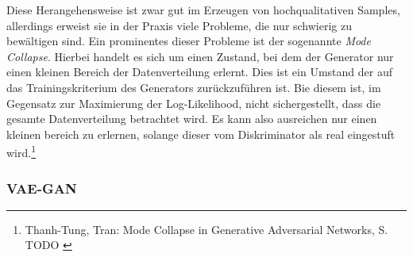 Diese Herangehensweise ist zwar gut im Erzeugen von hochqualitativen Samples, allerdings erweist sie in der Praxis viele Probleme, die nur schwierig zu bewältigen sind. Ein prominentes dieser Probleme ist der sogenannte \textit{Mode Collapse}. Hierbei handelt es sich um einen Zustand, bei dem der Generator nur einen kleinen Bereich der Datenverteilung erlernt. Dies ist ein Umstand der auf das Trainingskriterium des Generators zurückzuführen ist. Bie diesem ist, im Gegensatz zur Maximierung der Log-Likelihood, nicht sichergestellt, dass die gesamte Datenverteilung betrachtet wird. Es kann also ausreichen nur einen kleinen bereich zu erlernen, solange dieser vom Diskriminator als real eingestuft wird.\footnote{
    Thanh-Tung, Tran: Mode Collapse in Generative Adversarial Networks, S. TODO
    \cite{thanhtung2020catastrophicforgettingmodecollapse}
}

\subsubsection{VAE-GAN}

